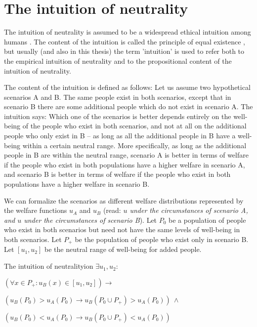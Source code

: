 \section{The intuition of neutrality}

The intuition of neutrality is assumed to be a widespread ethical intuition among humans \cite[p.~176f]{broome_2012}. The content of the intuition is called the principle of equal existence \cite[p.~146]{broome_2004}, but usually (and also in this thesis) the term 'intuition' is used to refer both to the empirical intuition of neutrality and to the propositional content of the intuition of neutrality. 

The content of the intuition is defined as follows: Let us assume two hypothetical scenarios A and B. The same people exist in both scenarios, except that in scenario B there are some additional people which do not exist in scenario A. The intuition says: Which one of the scenarios is better depends entirely on the well-being of the people who exist in both scenarios, and not at all on the additional people who only exist in B – as long as all the additional people in B have a well-being within a certain neutral range. More specifically, as long as the additional people in B are within the neutral range, scenario A is better in terms of welfare if the people who exist in both populations have a higher welfare in scenario A, and scenario B is better in terms of welfare if the people who exist in both populations have a higher welfare in scenario B.  

We can formalize the scenarios as different welfare distributions represented by the welfare functions $u_A$ and $u_B$ (read: \emph{$u$ under the circumstances of scenario A, and $u$ under the circumstances of scenario B}). Let $P_0$ be a population of people who exist in both scenarios but need not have the same levels of well-being in both scenarios. Let $P_+$ be the population of people who exist only in scenario B. Let $[u_1, u_2]$ be the neutral range of well-being for added people. 

\begin{Definition}{The intuition of neutrality}{ion} 
$
  \exists u_1, u_2: 
$

\hspace{.5cm} $
  (\forall x \in P_+ : u_B(x) \in [u_1, u_2] )
  \rightarrow 
$

\hspace{1cm} $
  ( u_B(P_0) > u_A(P_0) 
  \rightarrow 
  u_B(P_0 \cup P_+) > u_A(P_0) ) 
  \ \wedge
$  

\hspace{1cm} $
  ( u_B(P_0) < u_A(P_0) 
  \rightarrow 
  u_B(P_0 \cup P_+) < u_A(P_0) ) 
$
\end{Definition}

